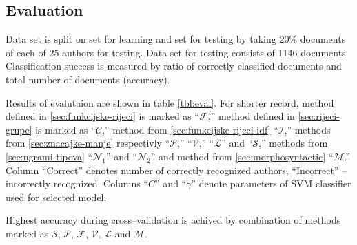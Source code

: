 \documentclass[11pt,english]{article}
\begin{document}
\begin{multicols}{2}
\section{Evaluation}
\label{sec:evaluacija}
Data set is split on set for learning and set for testing by taking 20\%
documents of each of 25 authors for testing. Data set for testing consists of
1146 documents. Classification success is measured by ratio of correctly
classified documents and total number of documents (accuracy).

Results of evalutaion are shown in table \ref{tbl:eval}. For shorter record,
method defined in \ref{sec:funkcijske-rijeci} is marked as ``$\mathcal{F}$,''
method defined in \ref{sec:rijeci-grupe} is marked as ``$\mathcal{C}$,'' method
from \ref{sec:funkcijske-rijeci-idf} ``$\mathcal{I}$,'' methods from
\ref{sec:znacajke-manje} respectivly ``$\mathcal{P}$,'' ``$\mathcal{V}$,'' 
``$\mathcal{L}$'' and ``$\mathcal{S}$,'' methods from \ref{sec:ngrami-tipova}
``$\mathcal{N}_1$'' and ``$\mathcal{N}_2$'' and method from
\ref{sec:morphosyntactic} ``$\mathcal{M}$.'' Column ``Correct'' denotes
number of correctly recognized authors, ``Incorrect'' -- incorrectly recognized.
Columns ``$C$'' and ``$\gamma$'' denote parameters of SVM classifier used for
selected model.

Highest accuracy during cross--validation is achived by combination of
methods marked as $\mathcal{S}$, $\mathcal{P}$, $\mathcal{F}$, $\mathcal{V}$,
$\mathcal{L}$ and $\mathcal{M}$.

% 
% 


\end{multicols}
\end{document}
